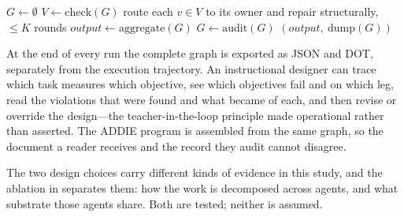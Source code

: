 \begin{algorithm}[t]
  \caption{AlignmentGraph-ISD execution}
  \label{alg:harness}
  $G \leftarrow \emptyset$\;
  $V \leftarrow \mathrm{check}(G)$ 
  route each $v \in V$ to its owner and repair structurally, $\le K$ rounds\;
  $output \leftarrow \mathrm{aggregate}(G)$\;
  $G \leftarrow \mathrm{audit}(G)$ 
  \Return $(output,\ \mathrm{dump}(G))$\;
\end{algorithm}

At the end of every run the complete graph is exported as JSON and DOT, separately
from the execution trajectory. An instructional designer can trace which task
measures which objective, see which objectives fail  and on which
leg, read the violations that were found and what became of each, and then revise
or override the design---the teacher-in-the-loop principle made operational rather
than asserted. The ADDIE program is assembled from the same graph, so the document
a reader receives and the record they audit cannot disagree.

The two design choices carry different kinds of evidence in this study, and the
ablation in  separates them: how the work is decomposed across
agents, and what substrate those agents share. Both are tested; neither is assumed.
